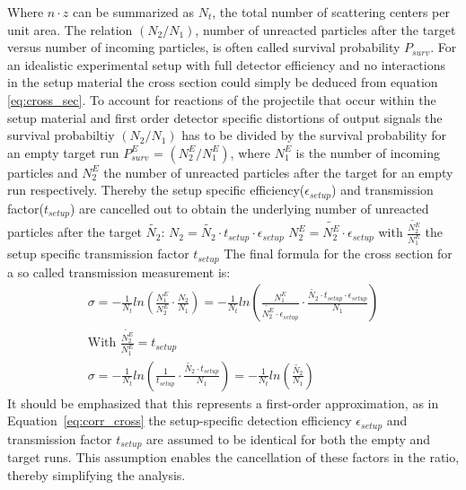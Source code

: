 Where $n\cdot z$ can be summarized as $N_t$, the total number of scattering centers per unit area. The relation $(N_{2}/N_{1})$, number of unreacted particles after the target versus number of incoming particles, is often called survival probability $P_{surv}$. For an idealistic experimental setup with full detector efficiency and no interactions in the setup material the cross section could simply be deduced from equation \ref{eq:cross_sec}. To account for reactions of the projectile that occur within the setup material and first order detector specific distortions of output signals the survival probabiltiy $(N_{2}/N_{1})$ has to be divided by the survival probability for an empty target run $P^{E}_{surv}$ = $(N_{2}^E/N_{1}^E)$, where $N_{1}^E$ is the number of incoming particles and $N_{2}^E$ the number of unreacted particles after the target for an empty run respectively. Thereby the setup specific efficiency($\epsilon_{setup}$) and transmission factor($t_{setup}$) are cancelled out to obtain the underlying number of unreacted particles after the target $\tilde{N_{2}}$:\newline
$N_{2} = \tilde{N_{2}} \cdot t_{setup}\cdot \epsilon_{setup}$\newline
$N_{2}^E = \tilde{N_{2}^E} \cdot \epsilon_{setup}$ with $\frac{\tilde{N_{2}^E}}{N_{1}^E}$ the setup specific transmission factor $t_{setup}$ \newline
\newline
The final formula for the cross section for a so called transmission measurement is:
\begin{equation}
	\begin{split}
\sigma = -\frac{1}{N_t} ln(\frac{N_{1}^E}{N_{2}^E} \cdot \frac{N_2}{N_1}) = -\frac{1}{N_t} ln(\frac{N_{1}^E}{\tilde{N_{2}^E} \cdot \epsilon_{setup}} \cdot \frac{\tilde{N_{2}} \cdot t_{setup} \cdot \epsilon_{setup}}{N_1}) \\
\text{With $\frac{\tilde{N_{2}^E}}{N_{1}^E} = t_{setup}$} \\
\sigma = -\frac{1}{N_t} ln(\frac{1}{t_{setup}} \cdot \frac{\tilde{N_{2}} \cdot t_{setup}}{N_1}) = -\frac{1}{N_t} ln(\frac{\tilde{N_{2}}}{N_1})
\label{eq:corr_cross}
	\end{split}
\end{equation}
It should be emphasized that this represents a first-order approximation, as in Equation~\ref{eq:corr_cross} the setup-specific detection efficiency $\epsilon_{setup}$ and transmission factor $t_{setup}$ are assumed to be identical for both the empty and target runs. This assumption enables the cancellation of these factors in the ratio, thereby simplifying the analysis.\newline
